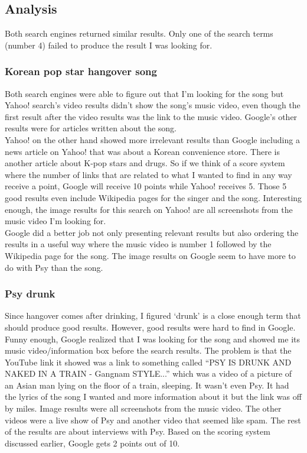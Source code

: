 \documentclass[10pt,letterpaper,bibliography=totocnumbered]{scrartcl}
\begin{document}
\subsection{Analysis}
Both search engines returned similar results. Only one of the search terms (number 4) failed to produce the result I was looking for. 

\subsubsection{Korean pop star hangover song}
Both search engines were able to figure out that I'm looking for the song but Yahoo! search's video results didn't show the song's music video, even though the first result after the video results was the link to the music video. Google's other results were for articles written about the song.\\

Yahoo! on the other hand showed more irrelevant results than Google including a news article on Yahoo! that was about a Korean convenience store. There is another article about K-pop stars and drugs. So if we think of a score system where the number of links that are related to what I wanted to find in any way receive a point, Google will receive 10 points while Yahoo! receives 5. Those 5 good results even include Wikipedia pages for the singer and the song. Interesting enough, the image results for this search on Yahoo! are all screenshots from the music video I'm looking for. \\

Google did a better job not only presenting relevant results but also ordering the results in a useful way where the music video is number 1 followed by the Wikipedia page for the song. The image results on Google seem to have more to do with Psy than the song.

\subsubsection{Psy drunk}
Since hangover comes after drinking, I figured `drunk' is a close enough term that should produce good results. However, good results were hard to find in Google. Funny enough, Google realized that I was looking for the song and showed me its music video/information box before the search results. The problem is that the YouTube link it showed was a link to something called ``PSY IS DRUNK AND NAKED IN A TRAIN - Gangnam STYLE...'' which was a video of a picture of an Asian man lying on the floor of a train, sleeping. It wasn't even Psy. It had the lyrics of the song I wanted and more information about it but the link was off by miles. Image results were all screenshots from the music video. The other videos were a live show of Psy and another video that seemed like spam. The rest of the results are about interviews with Psy. Based on the scoring system discussed earlier, Google gets 2 points out of 10. \\
\end{document}
